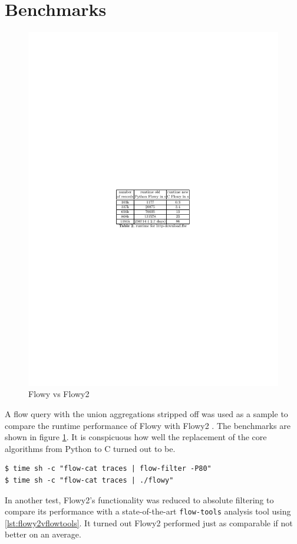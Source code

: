 \section{Benchmarks}\label{sec:benchmarks}
\begin{figure}[h!]
\begin{center}
  \includegraphics* [width=0.6\linewidth]{figures/flowy2-benchmarks}	
  \caption{Flowy vs Flowy2 \cite{jschauer:thesis:2011}}
  \label{fig:flowy2-benchmarks}
\end{center}
\end{figure}
A flow query with the union aggregations stripped off was used as a sample to compare the runtime performance of Flowy \cite{kkanev:thesis:2009} with Flowy2 \cite{jschauer:thesis:2011} . The benchmarks are shown in figure \ref{fig:flowy2-benchmarks}. It is conspicuous how well the replacement of the core algorithms from Python to C turned out to be. 

\begin{lstlisting}
$ time sh -c "flow-cat traces | flow-filter -P80"
$ time sh -c "flow-cat traces | ./flowy"
\end{lstlisting}

In another test, Flowy2's functionality was reduced to absolute filtering to compare its performance with a state-of-the-art \texttt{flow-tools} analysis tool using \ref{lst:flowy2vflowtools}. It turned out Flowy2 performed just as comparable if not better on an average.

